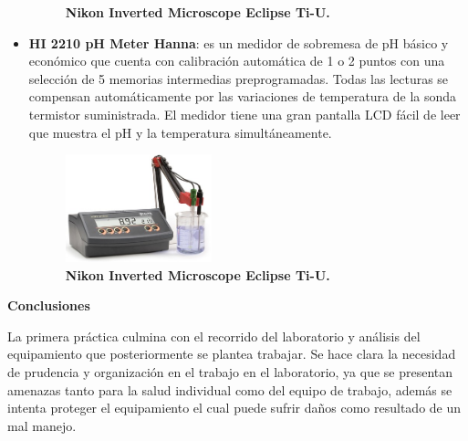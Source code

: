 \begin{itemize}
\begin{figure}
        \caption{\textbf{ Nikon Inverted Microscope Eclipse Ti-U.}}
        \label{microscopio}
        \end{figure}
        \item \textbf{\textcolor{morado}{HI 2210 pH Meter Hanna}}: es un medidor de sobremesa de pH básico y económico que cuenta con calibración automática de 1 o 2 puntos con una selección de 5 memorias intermedias preprogramadas. Todas las lecturas se compensan automáticamente por las variaciones de temperatura de la sonda termistor suministrada. El medidor tiene una gran pantalla LCD fácil de leer que muestra el pH y la temperatura simultáneamente. %
        \begin{figure}
            \includegraphics[width=0.4\textwidth]{Tarea1/ph.png}
        \caption{\textbf{ Nikon Inverted Microscope Eclipse Ti-U.}}
        \label{ph}
        \end{figure}
\end{itemize}
\textbf{\textcolor{azul50}{Conclusiones}}

 La primera práctica culmina con el recorrido del laboratorio y análisis del equipamiento que posteriormente se plantea trabajar. Se hace clara la necesidad de prudencia y organización en el trabajo en el laboratorio, ya que se presentan amenazas tanto para la salud individual como del equipo de trabajo, además se intenta proteger el equipamiento el cual puede sufrir daños como resultado de un mal manejo. 
 

 
 
 
 
 
 
 
 